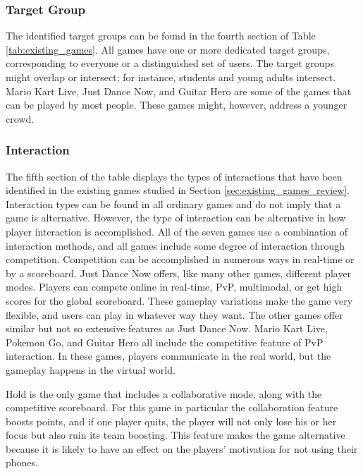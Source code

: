 \documentclass[../Main.tex]{subfiles}
\begin{document}
\subsubsection{Target Group}
The identified target groups can be found in the fourth section of Table \ref{tab:existing_games}. All games have one or more dedicated target groups, corresponding to everyone or a distinguished set of users. The target groups might overlap or intersect; for instance, students and young adults intersect. Mario Kart Live, Just Dance Now, and Guitar Hero are some of the games that can be played by most people. These games might, however, address a younger crowd.

\subsubsection{Interaction}
The fifth section of the table displays the types of interactions that have been identified in the existing games studied in Section \ref{sec:existing_games_review}. Interaction types can be found in all ordinary games and do not imply that a game is alternative. However, the type of interaction can be alternative in how player interaction is accomplished. All of the seven games use a combination of interaction methods, and all games include some degree of interaction through competition. Competition can be accomplished in numerous ways in real-time or by a scoreboard. Just Dance Now offers, like many other games, different player modes. Players can compete online in real-time, PvP, multimodal, or get high scores for the global scoreboard. These gameplay variations make the game very flexible, and users can play in whatever way they want. The other games offer similar but not so extensive features as Just Dance Now. Mario Kart Live, Pokemon Go, and Guitar Hero all include the competitive feature of PvP interaction. In these games, players communicate in the real world, but the gameplay happens in the virtual world.

Hold is the only game that includes a collaborative mode, along with the competitive scoreboard. For this game in particular the collaboration feature boosts points, and if one player quits, the player will not only lose his or her focus but also ruin its team boosting. This feature makes the game alternative because it is likely to have an effect on the players’ motivation for not using their phones. 
\end{document}
